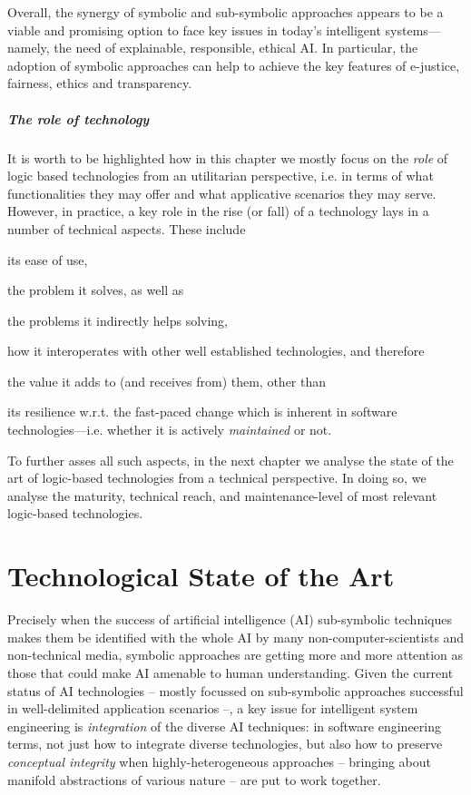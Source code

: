 \documentclass[12pt,a4paper,openright,twoside]{book}
\begin{document}
Overall, the synergy of symbolic and sub-symbolic approaches appears to be a viable and promising option to face key issues in today's intelligent systems---namely, the need of explainable, responsible, ethical AI.
%
In particular, the adoption of symbolic approaches can help to achieve the key features of e-justice, fairness, ethics and transparency.

\paragraph{The role of technology}

It is worth to be highlighted how in this chapter we mostly focus on the \emph{role} of logic based technologies from an utilitarian perspective, i.e. in terms of what functionalities they may offer and what applicative scenarios they may serve.
%
However, in practice, a key role in the rise (or fall) of a technology lays in a number of technical aspects.
%
These include
%
\begin{inlinelist}
    \item its ease of use,
    \item the problem it solves, as well as
    \item the problems it indirectly helps solving,
    \item how it interoperates with other well established technologies, and therefore
    \item the value it adds to (and receives from) them, other than
    \item its resilience w.r.t. the fast-paced change which is inherent in software technologies---i.e. whether it is actively \emph{maintained} or not.
\end{inlinelist}

To further asses all such aspects, in the next chapter we analyse the state of the art of logic-based technologies from a technical perspective.
%
In doing so, we analyse the maturity, technical reach, and maintenance-level of most relevant logic-based technologies.

\chapter{Technological State of the Art}
\label{chap:tech-soa}


Precisely when the success of artificial intelligence (AI) sub-symbolic techniques makes them be identified with the whole AI by many non-computer-scientists and non-technical media, symbolic approaches are getting more and more attention as those that could make AI amenable to human understanding.
%
Given the current status of AI technologies -- mostly focussed on sub-symbolic approaches successful in well-delimited application scenarios --, a key issue for intelligent system engineering is \emph{integration} of the diverse AI techniques: in software engineering terms, not just how to integrate diverse technologies, but also how to preserve \emph{conceptual integrity} when highly-heterogeneous approaches -- bringing about manifold abstractions of various nature -- are put to work together.
\end{document}
